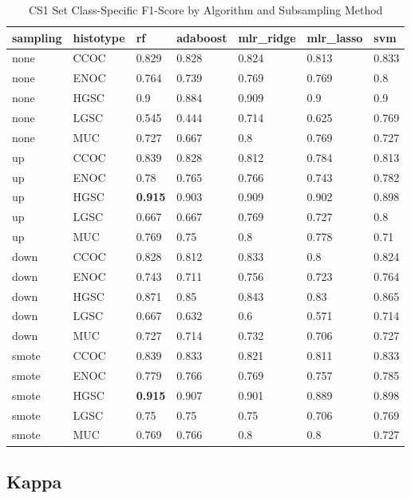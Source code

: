 \documentclass[
]{report}
\begin{document}
\begin{table}

\caption{\label{tab:cs1-f1-class-table}CS1 Set Class-Specific F1-Score by Algorithm and Subsampling Method}
\centering
\begin{tabular}[t]{l|l|l|l|l|l|l}
\hline
sampling & histotype & rf & adaboost & mlr\_ridge & mlr\_lasso & svm\\
\hline
none & CCOC & 0.829 & 0.828 & 0.824 & 0.813 & 0.833\\
\hline
none & ENOC & 0.764 & 0.739 & 0.769 & 0.769 & 0.8\\
\hline
none & HGSC & 0.9 & 0.884 & 0.909 & 0.9 & 0.9\\
\hline
none & LGSC & 0.545 & 0.444 & 0.714 & 0.625 & 0.769\\
\hline
none & MUC & 0.727 & 0.667 & 0.8 & 0.769 & 0.727\\
\hline
up & CCOC & 0.839 & 0.828 & 0.812 & 0.784 & 0.813\\
\hline
up & ENOC & 0.78 & 0.765 & 0.766 & 0.743 & 0.782\\
\hline
up & HGSC & \textbf{0.915} & 0.903 & 0.909 & 0.902 & 0.898\\
\hline
up & LGSC & 0.667 & 0.667 & 0.769 & 0.727 & 0.8\\
\hline
up & MUC & 0.769 & 0.75 & 0.8 & 0.778 & 0.71\\
\hline
down & CCOC & 0.828 & 0.812 & 0.833 & 0.8 & 0.824\\
\hline
down & ENOC & 0.743 & 0.711 & 0.756 & 0.723 & 0.764\\
\hline
down & HGSC & 0.871 & 0.85 & 0.843 & 0.83 & 0.865\\
\hline
down & LGSC & 0.667 & 0.632 & 0.6 & 0.571 & 0.714\\
\hline
down & MUC & 0.727 & 0.714 & 0.732 & 0.706 & 0.727\\
\hline
smote & CCOC & 0.839 & 0.833 & 0.821 & 0.811 & 0.833\\
\hline
smote & ENOC & 0.779 & 0.766 & 0.769 & 0.757 & 0.785\\
\hline
smote & HGSC & \textbf{0.915} & 0.907 & 0.901 & 0.889 & 0.898\\
\hline
smote & LGSC & 0.75 & 0.75 & 0.75 & 0.706 & 0.769\\
\hline
smote & MUC & 0.769 & 0.766 & 0.8 & 0.8 & 0.727\\
\hline
\end{tabular}
\end{table}

\hypertarget{kappa-1}{%
\subsection{Kappa}\label{kappa-1}}
\end{document}
